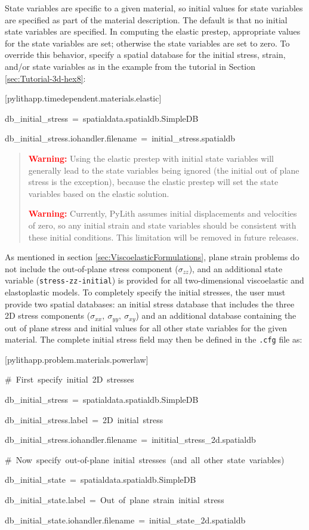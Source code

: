 State variables are specific to a given material, so initial values
for state variables are specified as part of the material description.
The default is that no initial state variables are specified. In computing
the elastic prestep, appropriate values for the state variables are
set; otherwise the state variables are set to zero. To override this
behavior, specify a spatial database for the initial stress, strain,
and/or state variables as in the example from the tutorial in Section
\ref{sec:Tutorial-3d-hex8}:
\begin{lyxcode}
{[}pylithapp.timedependent.materials.elastic{]}

db\_initial\_stress~=~spatialdata.spatialdb.SimpleDB

db\_initial\_stress.iohandler.filename~=~initial\_stress.spatialdb\end{lyxcode}
\begin{quote}
\textbf{\textcolor{red}{Warning:}}\textbf{ }Using the elastic prestep
with initial state variables will generally lead to the state variables
being ignored (the initial out of plane stress is the exception),
because the elastic prestep will set the state variables based on
the elastic solution.

\textbf{\textcolor{red}{Warning:}}\textbf{ }Currently, PyLith assumes
initial displacements and velocities of zero, so any initial strain
and state variables should be consistent with these initial conditions.
This limitation will be removed in future releases.
\end{quote}
As mentioned in section \ref{sec:ViscoelasticFormulations}, plane
strain problems do not include the out-of-plane stress component ($\sigma_{zz}$),
and an additional state variable (\texttt{stress-zz-initial}) is provided
for all two-dimensional viscoelastic and elastoplastic models. To
completely specify the initial stresses, the user must provide two
spatial databases: an initial stress database that includes the three
2D stress components ($\sigma_{xx},\:\sigma_{yy},\:\sigma_{xy}$)
and an additional database containing the out of plane stress and
initial values for all other state variables for the given material.
The complete initial stress field may then be defined in the \texttt{.cfg}
file as:
\begin{lyxcode}
{[}pylithapp.problem.materials.powerlaw{]}

\#~First~specify~initial~2D~stresses

db\_initial\_stress~=~spatialdata.spatialdb.SimpleDB

db\_initial\_stress.label~=~2D~initial~stress

db\_initial\_stress.iohandler.filename~=~inititial\_stress\_2d.spatialdb



\#~Now~specify~out-of-plane~initial~stresses~(and~all~other~state~variables)

db\_initial\_state~=~spatialdata.spatialdb.SimpleDB

db\_initial\_state.label~=~Out~of~plane~strain~initial~stress

db\_initial\_state.iohandler.filename~=~initial\_state\_2d.spatialdb
\end{lyxcode}
